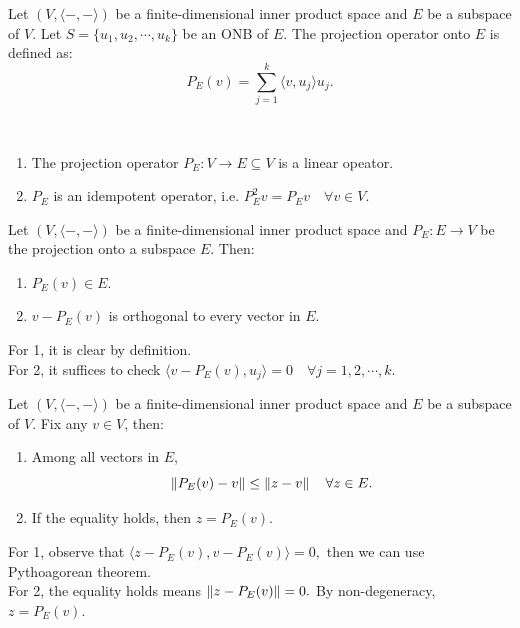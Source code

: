 \begin{definition}
    Let $(V,\langle-,-\rangle)$ be a finite-dimensional inner product space and $E$ be a subspace of $V$.
    Let $S=\{u_1,u_2,\cdots,u_k\}$ be an ONB of $E$. The projection operator onto $E$ is defined as:
    \[P_E(v)=\sum_{j=1}^{k}\langle v, u_j\rangle u_j.\] 
\end{definition}

\begin{remark}\
    \begin{enumerate}
        \item The projection operator $P_E:V\to E\subseteq V$ is a linear opeator.
        \item $P_E$ is an idempotent operator, i.e. $P^2_E v = P_E v\quad\forall v\in V$.
    \end{enumerate}
\end{remark}

\begin{theorem}
    Let $(V,\langle-,-\rangle)$ be a finite-dimensional inner product space and $P_E:E\to V$ be the projection onto a subspace $E$.
    Then:
    \begin{enumerate}
        \item $P_E(v)\in E$.
        \item $v-P_E(v)$ is orthogonal to every vector in $E$.
    \end{enumerate}
\end{theorem}

\begin{pfbox}
    For 1, it is clear by definition.\\
    For 2, it suffices to check $\langle v-P_E(v), u_j\rangle=0\quad \forall j=1,2,\cdots,k.$
\end{pfbox}


\begin{theorem}
  Let $(V,\langle-,-\rangle)$ be a finite-dimensional inner product space and $E$ be a subspace of $V$.
  Fix any $v\in V$, then:
  \begin{enumerate}
    \item Among all vectors in $E$,
    $$\left\lVert P_E(v)-v \right\rVert\le\left\lVert z-v \right\rVert\quad \forall z\in E.$$
    \item If the equality holds, then $z=P_E(v).$
  \end{enumerate}
\end{theorem}

\begin{pfbox}
    For 1, observe that $\langle z-P_E(v), v-P_E(v)\rangle=0,$ then we can use Pythoagorean theorem.\\
    For 2, the equality holds means $\left\lVert z-P_E(v) \right\rVert=0.$ By non-degeneracy, $z=P_E(v).$
\end{pfbox}


